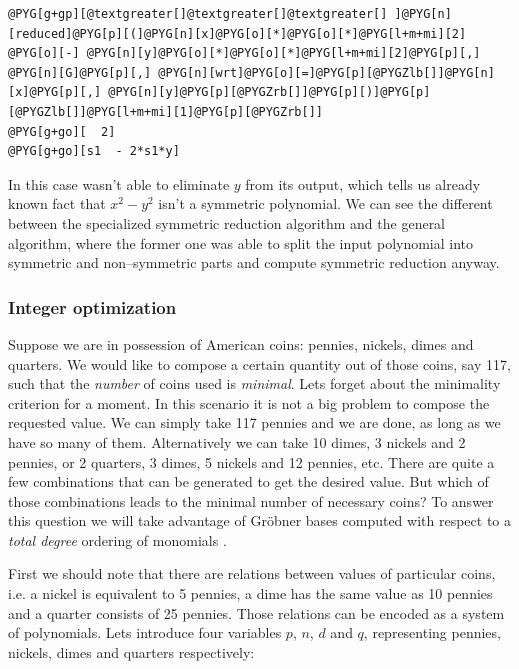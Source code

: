 \begin{Verbatim}[commandchars=@\[\]]
@PYG[g+gp][@textgreater[]@textgreater[]@textgreater[] ]@PYG[n][reduced]@PYG[p][(]@PYG[n][x]@PYG[o][*]@PYG[o][*]@PYG[l+m+mi][2] @PYG[o][-] @PYG[n][y]@PYG[o][*]@PYG[o][*]@PYG[l+m+mi][2]@PYG[p][,] @PYG[n][G]@PYG[p][,] @PYG[n][wrt]@PYG[o][=]@PYG[p][@PYGZlb[]]@PYG[n][x]@PYG[p][,] @PYG[n][y]@PYG[p][@PYGZrb[]]@PYG[p][)]@PYG[p][@PYGZlb[]]@PYG[l+m+mi][1]@PYG[p][@PYGZrb[]]
@PYG[g+go][  2]
@PYG[g+go][s1  - 2*s1*y]
\end{Verbatim}
\noindent
In this case \href{http://docs.python.org/library/functions.html\#reduce}{} wasn't able to eliminate $y$ from its output, which tells us already
known fact that $x^2 - y^2$ isn't a symmetric polynomial. We can see the different between the
specialized symmetric reduction algorithm and the general algorithm, where the former one was
able to split the input polynomial into symmetric and non--symmetric parts and compute symmetric
reduction anyway.


\subsubsection{Integer optimization}

Suppose we are in possession of American coins: pennies, nickels, dimes and quarters. We would like to
compose a certain quantity out of those coins, say 117, such that the \emph{number} of coins used is \emph{minimal}.
Lets forget about the minimality criterion for a moment. In this scenario it is not a big problem to
compose the requested value. We can simply take 117 pennies and we are done, as long as we have so
many of them. Alternatively we can take 10 dimes, 3 nickels and 2 pennies, or 2 quarters, 3 dimes,
5 nickels and 12 pennies, etc. There are quite a few combinations that can be generated to get the
desired value. But which of those combinations leads to the minimal number of necessary coins? To
answer this question we will take advantage of Gröbner bases computed with respect to a \emph{total
degree} ordering of monomials \cite{Buchberger2007talk}.

First we should note that there are relations between values of particular coins, i.e. a nickel is
equivalent to 5 pennies, a dime has the same value as 10 pennies and a quarter consists of 25 pennies.
Those relations can be encoded as a system of polynomials. Lets introduce four variables $p$, $n$, $d$
and $q$, representing pennies, nickels, dimes and quarters respectively:


